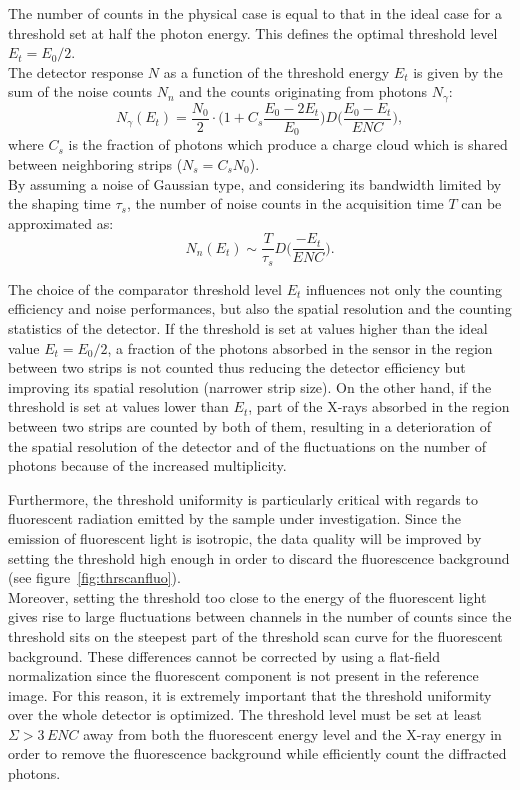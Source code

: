 The number of counts in the physical case is equal to that in the ideal case for a threshold set at half the photon energy. This defines the optimal threshold level $E_t=E_0/2$.\\
The detector response $N$ as a function of the threshold energy $E_t$ is given by the sum of the noise counts  $N_n$ and the counts originating from photons $N_\gamma$:
\begin{equation}
N_\gamma(E_t)=\frac{N_0}{2}\cdot\Big(1+C_s \frac{E_0-2E_t}{E_0}\Big)D \Big(\frac{E_0-E_t}{ENC} \Big), \label{eq:thrscan}
\end{equation}
where $C_s$ is the fraction of photons which produce a charge cloud which is shared between neighboring strips ($N_s=C_s N_0$).\\
By assuming a noise of Gaussian type, and considering its bandwidth limited by the shaping time  $\tau_s$, the number of noise counts in the acquisition time $T$ can be approximated as:
\begin{equation}
N_n(E_t) \sim \frac{T}{\tau_s}  D \Big(\frac{-E_t}{ENC} \Big). \label{eq:noisescan}
\end{equation} 

The choice of the comparator threshold level $E_t$ influences not only the counting efficiency and noise performances, but also the spatial resolution and the counting statistics of the detector. 
If the threshold is set at values higher than the ideal value $E_t=E_0/2$, a fraction of the photons absorbed in the sensor in the region between two strips is not counted thus reducing the detector efficiency but improving its spatial resolution (narrower strip size). On the other hand, if the threshold is set at values lower than $E_t$, part of the X-rays absorbed in the region between two strips are counted by both of them, resulting in a deterioration of the spatial resolution of the detector and of the fluctuations on the number of photons because of the increased multiplicity. 


Furthermore, the threshold uniformity is particularly critical with regards to fluorescent radiation emitted by the sample under investigation. Since the emission of fluorescent light is isotropic, the data quality will be improved by setting the threshold high enough in order to discard the fluorescence background (see figure~\ref{fig:thrscanfluo}). \\
Moreover, setting the threshold too close to the energy of the fluorescent light gives rise to large fluctuations between channels in the number of counts since the threshold sits on the steepest part of the threshold scan curve for the fluorescent background. These differences cannot be corrected by using a flat-field normalization  since the fluorescent component is not present in the reference image. For this reason, it is extremely important that the threshold uniformity over the whole detector is optimized. The threshold level must be set at least $\Sigma>3\,ENC$ away from both the fluorescent energy level and the X-ray energy in order to remove the fluorescence background while efficiently count the diffracted photons. 

